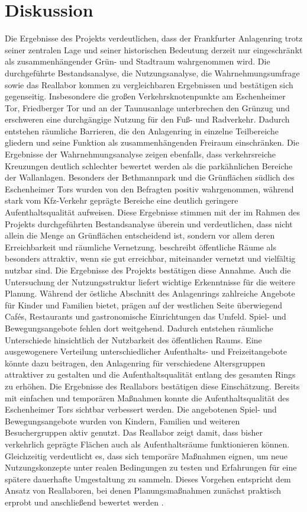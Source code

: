 \documentclass[a4paper,12pt]{article}
\begin{document}
\FloatBarrier
\section{Diskussion}
Die Ergebnisse des Projekts verdeutlichen, dass der Frankfurter Anlagenring trotz seiner zentralen Lage und seiner historischen Bedeutung derzeit nur eingeschränkt als zusammenhängender Grün- und Stadtraum wahrgenommen wird. Die durchgeführte Bestandsanalyse, die Nutzungsanalyse, die Wahrnehmungsumfrage sowie das Reallabor kommen zu vergleichbaren Ergebnissen und bestätigen sich gegenseitig. Insbesondere die großen Verkehrsknotenpunkte am Eschenheimer Tor, Friedberger Tor und an der Taunusanlage unterbrechen den Grünzug und erschweren eine durchgängige Nutzung für den Fuß- und Radverkehr. Dadurch entstehen räumliche Barrieren, die den Anlagenring in einzelne Teilbereiche gliedern und seine Funktion als zusammenhängenden Freiraum einschränken.
Die Ergebnisse der Wahrnehmungsanalyse zeigen ebenfalls, dass verkehrsreiche Kreuzungen deutlich schlechter bewertet werden als die parkähnlichen Bereiche der Wallanlagen. Besonders der Bethmannpark und die Grünflächen südlich des Eschenheimer Tors wurden von den Befragten positiv wahrgenommen, während stark vom Kfz-Verkehr geprägte Bereiche eine deutlich geringere Aufenthaltsqualität aufweisen. Diese Ergebnisse stimmen mit der im Rahmen des Projekts durchgeführten Bestandsanalyse überein und verdeutlichen, dass nicht allein die Menge an Grünflächen entscheidend ist, sondern vor allem deren Erreichbarkeit und räumliche Vernetzung. \textcite{jacobs1961} beschreibt öffentliche Räume als besonders attraktiv, wenn sie gut erreichbar, miteinander vernetzt und vielfältig nutzbar sind. Die Ergebnisse des Projekts bestätigen diese Annahme.
Auch die Untersuchung der Nutzungsstruktur liefert wichtige Erkenntnisse für die weitere Planung. Während der östliche Abschnitt des Anlagenrings zahlreiche Angebote für Kinder und Familien bietet, prägen auf der westlichen Seite überwiegend Cafés, Restaurants und gastronomische Einrichtungen das Umfeld. Spiel- und Bewegungsangebote fehlen dort weitgehend. Dadurch entstehen räumliche Unterschiede hinsichtlich der Nutzbarkeit des öffentlichen Raums. Eine ausgewogenere Verteilung unterschiedlicher Aufenthalts- und Freizeitangebote könnte dazu beitragen, den Anlagenring für verschiedene Altersgruppen attraktiver zu gestalten und die Aufenthaltsqualität entlang des gesamten Rings zu erhöhen.
Die Ergebnisse des Reallabors bestätigen diese Einschätzung. Bereits mit einfachen und temporären Maßnahmen konnte die Aufenthaltsqualität des Eschenheimer Tors sichtbar verbessert werden. Die angebotenen Spiel- und Bewegungsangebote wurden von Kindern, Familien und weiteren Besuchergruppen aktiv genutzt. Das Reallabor zeigt damit, dass bisher verkehrlich geprägte Flächen auch als Aufenthaltsräume funktionieren können. Gleichzeitig verdeutlicht es, dass sich temporäre Maßnahmen eignen, um neue Nutzungskonzepte unter realen Bedingungen zu testen und Erfahrungen für eine spätere dauerhafte Umgestaltung zu sammeln. Dieses Vorgehen entspricht dem Ansatz von Reallaboren, bei denen Planungsmaßnahmen zunächst praktisch erprobt und anschließend bewertet werden \autocite{bbsrziz2025}.
\end{document}
